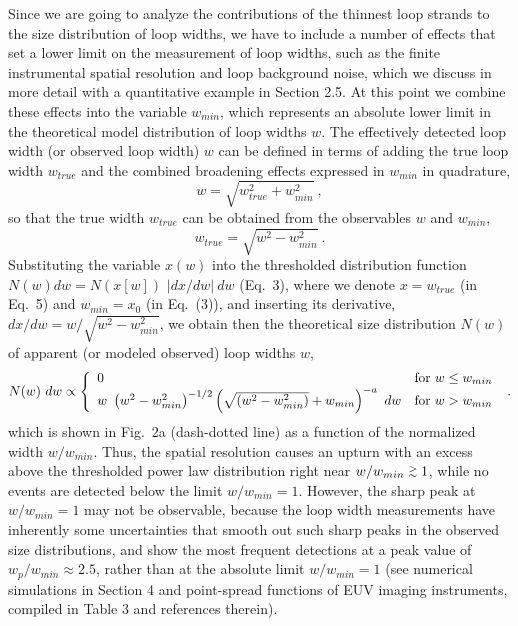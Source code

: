 \documentclass[10pt,preprint]{aastex}  %
\def\gapprox{\lower.4ex\hbox{$\;\buildrel >\over{\scriptstyle\sim}\;$}}
\begin{document}
Since we are going to analyze the contributions of the thinnest 
loop strands to the size distribution of loop widths, we have to
include a number of effects that set a lower limit on the measurement 
of loop widths, such as the finite instrumental spatial resolution and
loop background noise, which we discuss in more detail with a
quantitative example in Section 2.5. At this point we combine these
effects into the variable $w_{min}$, which represents an absolute
lower limit in the theoretical model distribution of loop widths $w$.
The effectively detected loop width (or observed loop width) $w$
can be defined in terms of adding the true loop width $w_{true}$ and the
combined broadening effects expressed in $w_{min}$ in quadrature, 
\begin{equation}
	w = \sqrt{ w_{true}^2 + w_{min}^2 } \ ,
\end{equation}
so that the true width $w_{true}$ can be obtained from the observables
$w$ and $w_{min}$,
\begin{equation}
	w_{true} = \sqrt{ w^2 - w_{min}^2 } \ .
\end{equation}
Substituting the variable $x(w)$ into the thresholded distribution 
function $N(w) dw =N(x[w])$ $|dx/dw| \ dw$ (Eq.~3), where 
we denote $x=w_{true}$ (in Eq.~5) and $w_{min}=x_0$ (in Eq.~(3)), 
and inserting its derivative, $dx/dw=w/\sqrt{w^2-w_{min}^2}$, 
we obtain then the theoretical size distribution $N(w)$ of apparent 
(or modeled observed) loop widths $w$,
\begin{equation}
	N(w) \ dw \propto \left\{
		\begin{array}{ll}
		0	& {\rm for} \ w \le w_{min}	\\
		w \ \left(w^2-w_{min}^2 \right)^{-1/2} 
		\left( \sqrt{(w^2-w_{min}^2)} + w_{min} \right)^{-a} \ dw
			& {\rm for} \ w > w_{min}	
		\end{array}
		\right. \ .
\end{equation}
which is shown in Fig.~2a (dash-dotted line) as a function of the
normalized width $w/w_{min}$. Thus, the spatial resolution causes an upturn 
with an excess above the thresholded power law distribution right near 
$w/w_{min} \gapprox 1$, while no events are detected below the limit 
$w/w_{min} = 1$. However, the sharp peak at $w/w_{min}=1$ may not be observable, 
because the loop width measurements have inherently some uncertainties 
that smooth out such sharp peaks in the observed size distributions,
and show the most frequent detections at a peak value of $w_p/w_{min} 
\approx 2.5$, rather than at the absolute limit $w/w_{min}=1$
(see numerical simulations in Section 4 and point-spread functions of 
EUV imaging instruments, compiled in Table 3 and references therein). 
\end{document}
